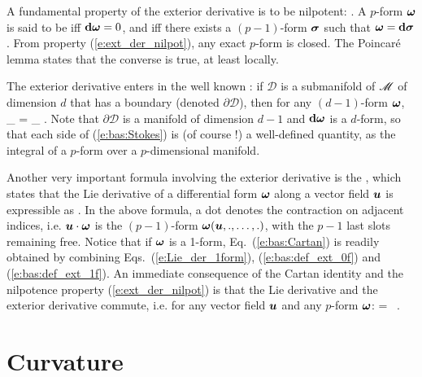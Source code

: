 A fundamental property of the exterior derivative is to be nilpotent:
\be \label{e:ext_der_nilpot}
    .
\ee
A $p$-form $\bm{\omega}$ is said to be  iff $\mathbf{d}\bm{\omega}=0$,
and  iff there exists a $(p-1)$-form $\bm{\sigma}$ such that
$\bm{\omega} = \mathbf{d}\bm{\sigma}$. From property (\ref{e:ext_der_nilpot}),
any exact $p$-form is closed. The Poincaré lemma states that the converse is true,
at least locally.

The exterior derivative enters in the well known : if $\mathcal{D}$
is a submanifold of $\mathscr{M}$ of dimension $d$ that has a boundary (denoted $\partial\mathcal{D}$), then for any $(d-1)$-form $\bm{\omega}$,
\be \label{e:bas:Stokes}
    \int_{\partial{}} \w{\omega} =
    \int_{} \dd\w{\omega} .
\ee
Note that $\partial\mathcal{D}$ is a manifold of dimension $d-1$ and
$\mathbf{d}\bm{\omega}$ is a $d$-form, so that each side of
(\ref{e:bas:Stokes}) is (of course !) a well-defined quantity,
as the integral of a $p$-form over a $p$-dimensional manifold.

Another very important formula involving the exterior derivative is
the , which states that the
Lie derivative of a differential form
$\bm{\omega}$ along a vector field $\bm{u}$ is expressible as
\be \label{e:bas:Cartan}
    .
\ee
In the above formula, a dot denotes the contraction on adjacent indices, i.e.
$\bm{u}\cdot\bm{\omega}$ is the $(p-1)$-form $\bm{\omega}(\bm{u},.,\ldots,.)$,
with the $p-1$ last slots remaining free. Notice that if $\bm{\omega}$ is
a 1-form, Eq.~(\ref{e:bas:Cartan}) is readily obtained
by combining Eqs.~(\ref{e:Lie_der_1form}),
(\ref{e:bas:def_ext_0f}) and (\ref{e:bas:def_ext_1f}).
An immediate consequence of the Cartan identity and the nilpotence property
(\ref{e:ext_der_nilpot}) is that the Lie derivative
and the exterior derivative commute, i.e. for any vector field $\bm{u}$
and any $p$-form $\bm{\omega}$:
\be \label{e:bas:Lie_ext_commute}
     \dd \w{\omega} = \dd \, \! \w{\omega} .
\ee


\section{Curvature} \label{s:bas:curvat}

